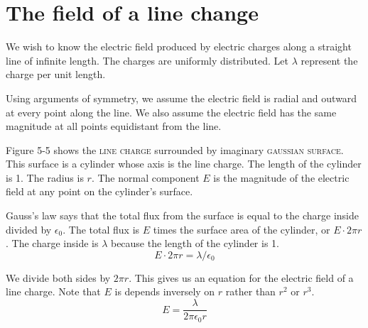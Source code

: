 \section{The field of a line change}

We wish to know the electric field produced by electric charges
along a straight line of infinite length.
The charges are uniformly distributed.
Let $\lambda$ represent the charge per unit length.

Using arguments of symmetry, we assume the electric field is radial and outward 
at every point along the line. We also assume the electric field has the same 
magnitude at all points equidistant from the line.

Figure 5-5 shows the \textsc{line charge} surrounded by imaginary \textsc{gaussian surface}.
This surface is a cylinder whose axis is the line charge.
The length of the cylinder is 1.  The radius is $r$.
The normal component $E$ is the magnitude of the electric field at any point 
on the cylinder's surface.

Gauss's law says that the total flux from the surface is equal to 
the charge inside divided by $\epsilon_0$.
The total flux is $E$ times the surface area of the cylinder, or $E \cdot 2 \pi r$.
The charge inside is $\lambda$ because the length of the cylinder is 1.
\begin{equation*}
  E \cdot 2 \pi r = \lambda / \epsilon_0
\end{equation*}

We divide both sides by $2 \pi r$.
This gives us an equation for the electric field of a line charge.
Note that $E$ is depends inversely on $r$ rather than $r^2$ or $r^3$.
\begin{equation}
  E = \frac{\lambda}{2 \pi \epsilon_0 r}
\end{equation}
